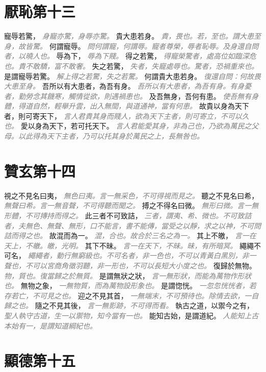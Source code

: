 \documentclass[a4paper,zihao=-4,oneside,landscape,UTF8]{ctexart}
\newcommand{\zhushi}[1]{\scriptsize{\textit{\textcolor{gray}{#1}}}\normalsize}
\begin{document}
\section{厭恥第十三}

寵辱若驚，
\zhushi{身寵亦驚，身辱亦驚。}
貴大患若身。
\zhushi{貴，畏也。若，至也。謂大患至身，故皆驚。}
何謂寵辱。
\zhushi{問何謂寵，何謂辱。寵者尊榮，辱者恥辱。及身還自問者，以曉人也。}
辱為下，
\zhushi{辱為下賤。}
得之若驚，
\zhushi{得寵榮驚者，處高位如臨深危也。貴不敢驕，富不敢奢。}
失之若驚，
\zhushi{失者，失寵處辱也。驚者，恐禍重來也。}
是謂寵辱若驚。
\zhushi{解上得之若驚，失之若驚。}
何謂貴大患若身。
\zhushi{復還自問：何故畏大患至身。}
吾所以有大患者，為吾有身。
\zhushi{吾所以有大患者，為吾有身。有身憂者，勤勞念其饑寒，觸情從欲，則遇禍患也。}
及吾無身，吾何有患。
\zhushi{使吾無有身體，得道自然，輕舉升雲，出入無間，與道通神，當有何患。}
故貴以身為天下者，則可寄天下，
\zhushi{言人君貴其身而賤人，欲為天下主者，則可寄立，不可以久也。}
愛以身為天下，若可托天下。
\zhushi{言人君能愛其身，非為己也，乃欲為萬民之父母。以此得為天下主者，乃可以托其身於萬民之上，長無咎也。}


\section{贊玄第十四}


視之不見名曰夷，
\zhushi{無色曰夷。言一無采色，不可得視而見之。}
聽之不見名曰希，
\zhushi{無聲曰希。言一無音聲，不可得聽而聞之。}
搏之不得名曰微。
\zhushi{無形曰微。言一無形體，不可摶持而得之。}
此三者不可致詰，
\zhushi{三者，謂夷、希、微也。不可致詰者，夫無色、無聲、無形，口不能言，書不能傳，當受之以靜，求之以神，不可問詰而得之也。}
故混而為一。
\zhushi{混，合也。故合於三名之為一。}
其上不皦，
\zhushi{言一在天上，不皦。皦，光明。}
其下不昧。
\zhushi{言一在天下，不昧。昧，有所暗冥。}
繩繩不可名，
\zhushi{繩繩者，動行無窮級也。不可名者，非一色也，不可以青黃白黑別，非一聲也，不可以宮商角徵羽聽，非一形也，不可以長短大小度之也。}
復歸於無物。
\zhushi{物，質也。復當歸之於無質。}
是謂無狀之狀，
\zhushi{言一無形狀，而能為萬物作形狀也。}
無物之象，
\zhushi{一無物質，而為萬物設形象也。}
是謂惚恍。
\zhushi{一忽忽恍恍者，若存若亡，不可見之也。}
迎之不見其首，
\zhushi{一無端末，不可預待也。除情去欲，一自歸之也。}
隨之不見其後，
\zhushi{言一無影跡，不可得而看。}
執古之道，以禦今之有，
\zhushi{聖人執守古道，生一以禦物，知今當有一也。}
能知古始，是謂道紀。
\zhushi{人能知上古本始有一，是謂知道綱紀也。}


\section{顯德第十五}
\end{document}
